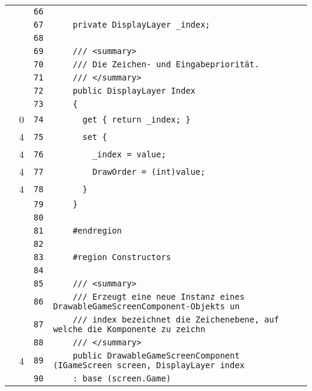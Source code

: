 \documentclass[a4paper,10pt]{article}
\begin{document}
\begin{longtable}[l]{lrrl}
\cellcolor{gray} &  & \verb~66~ & \verb~~\\
\cellcolor{gray} &  & \verb~67~ & \verb~    private DisplayLayer _index;~\\
\cellcolor{gray} &  & \verb~68~ & \verb~~\\
\cellcolor{gray} &  & \verb~69~ & \verb~    /// <summary>~\\
\cellcolor{gray} &  & \verb~70~ & \verb~    /// Die Zeichen- und Eingabepriorität.~\\
\cellcolor{gray} &  & \verb~71~ & \verb~    /// </summary>~\\
\cellcolor{gray} &  & \verb~72~ & \verb~    public DisplayLayer Index~\\
\cellcolor{gray} &  & \verb~73~ & \verb~    {~\\
\cellcolor{red} & 0 & \verb~74~ & \verb~      get { return _index; }~\\
\cellcolor{green} & 4 & \verb~75~ & \verb~      set {~\\
\cellcolor{green} & 4 & \verb~76~ & \verb~        _index = value;~\\
\cellcolor{green} & 4 & \verb~77~ & \verb~        DrawOrder = (int)value;~\\
\cellcolor{green} & 4 & \verb~78~ & \verb~      }~\\
\cellcolor{gray} &  & \verb~79~ & \verb~    }~\\
\cellcolor{gray} &  & \verb~80~ & \verb~~\\
\cellcolor{gray} &  & \verb~81~ & \verb~    #endregion~\\
\cellcolor{gray} &  & \verb~82~ & \verb~~\\
\cellcolor{gray} &  & \verb~83~ & \verb~    #region Constructors~\\
\cellcolor{gray} &  & \verb~84~ & \verb~~\\
\cellcolor{gray} &  & \verb~85~ & \verb~    /// <summary>~\\
\cellcolor{gray} &  & \verb~86~ & \verb~    /// Erzeugt eine neue Instanz eines DrawableGameScreenComponent-Objekts un~\\
\cellcolor{gray} &  & \verb~87~ & \verb~    /// index bezeichnet die Zeichenebene, auf welche die Komponente zu zeichn~\\
\cellcolor{gray} &  & \verb~88~ & \verb~    /// </summary>~\\
\cellcolor{green} & 4 & \verb~89~ & \verb~    public DrawableGameScreenComponent (IGameScreen screen, DisplayLayer index~\\
\cellcolor{gray} &  & \verb~90~ & \verb~    : base (screen.Game)~\\

\end{longtable}
\end{document}
